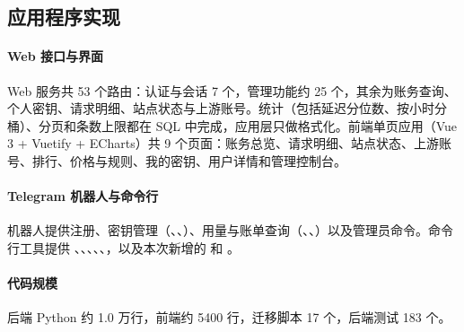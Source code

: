 \subsection{应用程序实现}

\paragraph{Web 接口与界面}
Web 服务共 53 个路由：认证与会话 7 个，管理功能约 25 个，其余为账务查询、个人密钥、请求明细、站点状态与上游账号。统计（包括延迟分位数、按小时分桶）、分页和条数上限都在 SQL 中完成，应用层只做格式化。前端单页应用（Vue 3 + Vuetify + ECharts）共 9 个页面：账务总览、请求明细、站点状态、上游账号、排行、价格与规则、我的密钥、用户详情和管理控制台。

\paragraph{Telegram 机器人与命令行}
机器人提供注册、密钥管理（、、）、用量与账单查询（、、）以及管理员命令。命令行工具提供 、、、、、，以及本次新增的  和 。

\paragraph{代码规模}
后端 Python 约 1.0 万行，前端约 5400 行，迁移脚本 17 个，后端测试 183 个。
